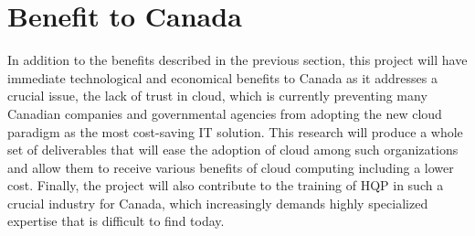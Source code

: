 \documentclass[12pt]{article}
\begin{document}
\vspace{-3mm}
\section{Benefit to Canada}
\vspace{-2mm} 

In addition to the benefits described in the previous section, this
project will have immediate technological and economical benefits to
Canada as it addresses a crucial issue, the lack of trust in cloud,
which is currently preventing many Canadian companies and governmental
agencies from adopting the new cloud paradigm as the most cost-saving
IT solution. This research will produce a whole set of deliverables
that will ease the adoption of cloud among such organizations and
allow them to receive various benefits of cloud computing including a
lower cost. Finally, the project will also contribute to the training
of HQP in such a crucial industry for Canada, which increasingly
demands highly specialized expertise that is difficult to find today.














\pagebreak

 
\end{document}
